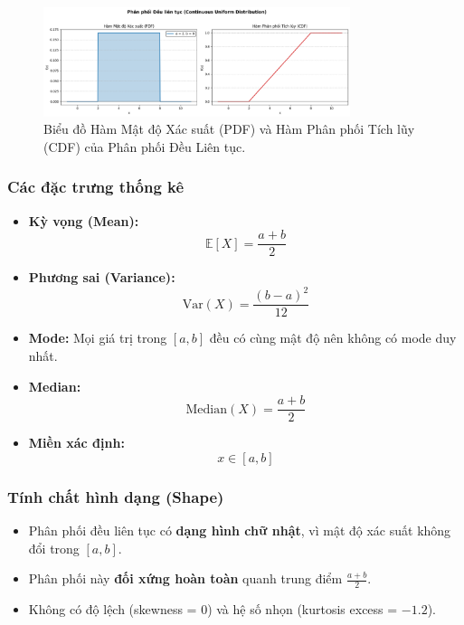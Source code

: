 \documentclass[a4paper,12pt]{article}
\begin{document}
  
\begin{figure}[h!]
    \centering
    \includegraphics[width=0.8\textwidth]{images/Uniform_PDF_and_CDF.png}
    \caption{Biểu đồ Hàm Mật độ Xác suất (PDF) và Hàm Phân phối Tích lũy (CDF) của Phân phối Đều Liên tục.}
    \label{fig:uniform_cont_dist}
\end{figure}

\subsubsection{Các đặc trưng thống kê}

\begin{itemize}
    \item \textbf{Kỳ vọng (Mean):}
    \[
    \mathbb{E}[X] = \frac{a + b}{2}
    \]
    \item \textbf{Phương sai (Variance):}
    \[
    \mathrm{Var}(X) = \frac{(b - a)^2}{12}
    \]
    \item \textbf{Mode:} Mọi giá trị trong $[a, b]$ đều có cùng mật độ nên không có mode duy nhất.
    \item \textbf{Median:}
    \[
    \mathrm{Median}(X) = \frac{a + b}{2}
    \]
    \item \textbf{Miền xác định:}
    \[
    x \in [a, b]
    \]
\end{itemize}

\subsubsection{Tính chất hình dạng (Shape)}

\begin{itemize}
    \item Phân phối đều liên tục có \textbf{dạng hình chữ nhật}, vì mật độ xác suất không đổi trong $[a, b]$.
    \item Phân phối này \textbf{đối xứng hoàn toàn} quanh trung điểm $\frac{a + b}{2}$.
    \item Không có độ lệch (skewness = 0) và hệ số nhọn (kurtosis excess = $-1.2$).
\end{itemize}
\end{document}
